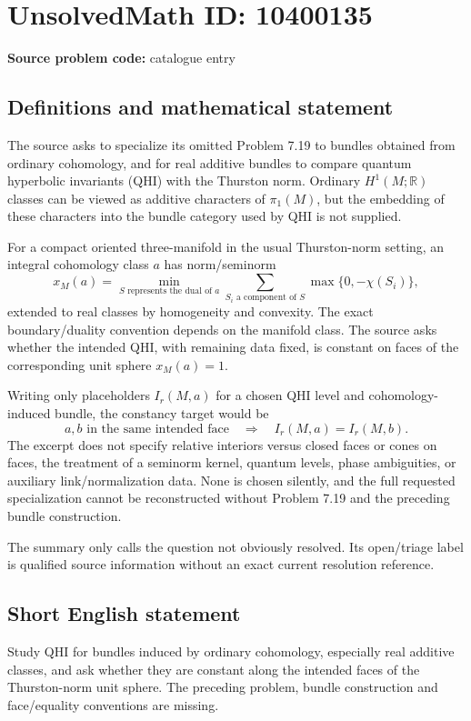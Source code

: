 \documentclass[11pt]{article}
\begin{document}
\section*{UnsolvedMath ID: 10400135}
\textbf{Source problem code:} catalogue entry
\subsection{Definitions and mathematical statement}
The source asks to specialize its omitted Problem 7.19 to bundles obtained from ordinary cohomology, and for real additive bundles to compare quantum hyperbolic invariants (QHI) with the Thurston norm. Ordinary \(H^1(M;\mathbb R)\) classes can be viewed as additive characters of \(\pi_1(M)\), but the embedding of these characters into the bundle category used by QHI is not supplied.

For a compact oriented three-manifold in the usual Thurston-norm setting, an integral cohomology class \(a\) has norm/seminorm
\[
 x_M(a)=\min_{S\text{ represents the dual of }a}
 \sum_{S_i\text{ a component of }S}\max\{0,-\chi(S_i)\},
\]
extended to real classes by homogeneity and convexity. The exact boundary/duality convention depends on the manifold class. The source asks whether the intended QHI, with remaining data fixed, is constant on faces of the corresponding unit sphere \(x_M(a)=1\).

Writing only placeholders \(I_r(M,a)\) for a chosen QHI level and cohomology-induced bundle, the constancy target would be
\[
 a,b\text{ in the same intended face}\quad\Longrightarrow\quad
 I_r(M,a)=I_r(M,b).
\]
The excerpt does not specify relative interiors versus closed faces or cones on faces, the treatment of a seminorm kernel, quantum levels, phase ambiguities, or auxiliary link/normalization data. None is chosen silently, and the full requested specialization cannot be reconstructed without Problem 7.19 and the preceding bundle construction.

The summary only calls the question not obviously resolved. Its open/triage label is qualified source information without an exact current resolution reference.
\subsection{Short English statement}
Study QHI for bundles induced by ordinary cohomology, especially real additive classes, and ask whether they are constant along the intended faces of the Thurston-norm unit sphere. The preceding problem, bundle construction and face/equality conventions are missing.
\end{document}
